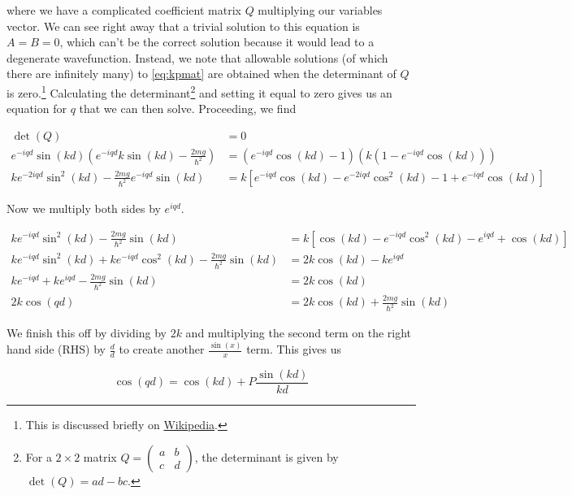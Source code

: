 \noindent where we have a complicated coefficient matrix $Q$ multiplying our variables vector. 
We can see right away that a trivial solution to this equation is $A = B = 0$, which can't be the correct solution because it would lead to a degenerate wavefunction. 
Instead, we note that allowable solutions (of which there are infinitely many) to \autoref{eq:kpmat} are obtained when the determinant of $Q$ is zero.\footnote{This is discussed briefly on \href{https://en.wikipedia.org/wiki/System_of_linear_equations\#Homogeneous_systems}{Wikipedia}.} 
Calculating the determinant\footnote{For a $2\times2$ matrix $Q=\begin{pmatrix} a & b \\ c & d	\end{pmatrix}$, the determinant is given by $\det(Q) = ad - bc$.} and setting it equal to zero gives us an equation for $q$ that we can then solve. 
Proceeding, we find

\begin{align*}
	\det(Q) &= 0 \\
	e^{-iqd}\sin(kd) \left( e^{-iqd}k\sin(kd) - \frac{2mg}{\hbar^2} \right) &= \left( e^{-iqd}\cos(kd) - 1 \right) \left( k\left(1 - e^{-iqd}\cos(kd)\right) \right) \\
	ke^{-2iqd} \sin^2(kd) - \frac{2mg}{\hbar^2}e^{-iqd}\sin(kd) &= k\left[ e^{-iqd}\cos(kd) - e^{-2iqd}\cos^2(kd) - 1 + e^{-iqd}\cos(kd) \right]
\end{align*}

\noindent Now we multiply both sides by $e^{iqd}$.

\begin{align*}
	ke^{-iqd}\sin^2(kd) - \frac{2mg}{\hbar^2}\sin(kd) &= k\left[ \cos(kd) - e^{-iqd}\cos^2(kd) - e^{iqd} + \cos(kd) \right] \\
	ke^{-iqd}\sin^2(kd) + ke^{-iqd}\cos^2(kd) - \frac{2mg}{\hbar^2}\sin(kd) &= 2k\cos(kd) - ke^{iqd} \\
	ke^{-iqd} + ke^{iqd} - \frac{2mg}{\hbar^2}\sin(kd) &= 2k\cos(kd) \\
	2k\cos(qd) &= 2k\cos(kd) + \frac{2mg}{\hbar^2}\sin(kd)
\end{align*}

We finish this off by dividing by $2k$ and multiplying the second term on the right hand side (RHS) by $\frac{d}{d}$ to create another $\frac{\sin(x)}{x}$ term. 
This gives us

\begin{tcolorbox}[title = Kronig-Penney model allowed solutions] \vspace{-2ex}
	\begin{equation}
		\cos(qd) = \cos(kd) + P\frac{\sin(kd)}{kd} \label{eq:kp}
	\end{equation}
\end{tcolorbox}


